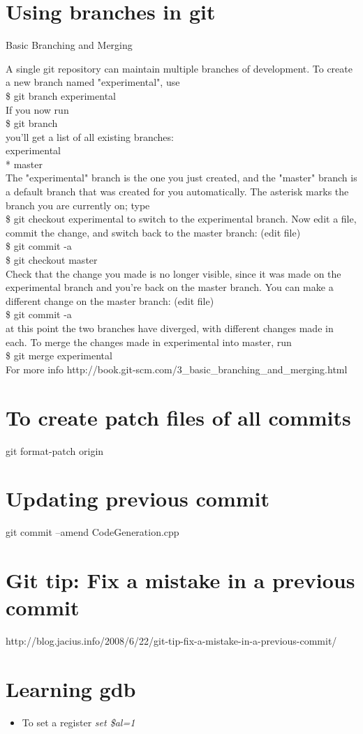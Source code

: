 \documentclass[a4paper,10pt]{article}
\begin{document}
\section{Using branches in git}

Basic Branching and Merging

A single git repository can maintain multiple branches of development. To create a new branch named "experimental", use\\
\$ git branch experimental\\
If you now run\\
\$ git branch\\
you'll get a list of all existing branches:\\
experimental\\
* master\\
	The "experimental" branch is the one you just created, and the "master" branch is a default branch that was created for you automatically. The asterisk marks the branch you are currently on; type\\
\$ git checkout experimental
	to switch to the experimental branch. Now edit a file, commit the change, and switch back to the master branch:
	(edit file)\\
\$ git commit -a\\
\$ git checkout master\\
Check that the change you made is no longer visible, since it was made on the experimental branch and you're back on the master branch.
	You can make a different change on the master branch:
	(edit file)\\
\$ git commit -a\\
at this point the two branches have diverged, with different changes made in each. To merge the changes made in experimental into master, run\\
\$ git merge experimental\\

For more info http://book.git-scm.com/3\_basic\_branching\_and\_merging.html\\

\section{To create patch files of all commits}
git format-patch origin
\section{Updating previous commit}

git commit --amend CodeGeneration.cpp
\section{Git tip: Fix a mistake in a previous commit}

http://blog.jacius.info/2008/6/22/git-tip-fix-a-mistake-in-a-previous-commit/
\section{Learning gdb}

\begin{itemize}
\item To set a register \emph{set \$al=1}
\end{itemize}
\end{document}
